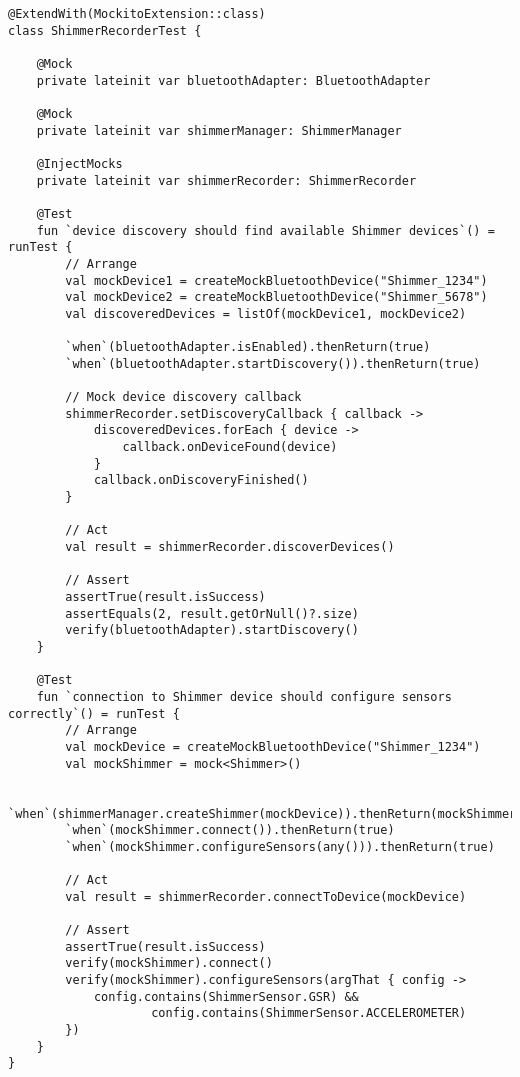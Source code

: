 \documentclass[12pt,a4paper]{report}
\begin{document}
\begin{verbatim}
@ExtendWith(MockitoExtension::class)
class ShimmerRecorderTest {

    @Mock
    private lateinit var bluetoothAdapter: BluetoothAdapter

    @Mock
    private lateinit var shimmerManager: ShimmerManager

    @InjectMocks
    private lateinit var shimmerRecorder: ShimmerRecorder

    @Test
    fun `device discovery should find available Shimmer devices`() = runTest {
        // Arrange
        val mockDevice1 = createMockBluetoothDevice("Shimmer_1234")
        val mockDevice2 = createMockBluetoothDevice("Shimmer_5678")
        val discoveredDevices = listOf(mockDevice1, mockDevice2)

        `when`(bluetoothAdapter.isEnabled).thenReturn(true)
        `when`(bluetoothAdapter.startDiscovery()).thenReturn(true)

        // Mock device discovery callback
        shimmerRecorder.setDiscoveryCallback { callback ->
            discoveredDevices.forEach { device ->
                callback.onDeviceFound(device)
            }
            callback.onDiscoveryFinished()
        }

        // Act
        val result = shimmerRecorder.discoverDevices()

        // Assert
        assertTrue(result.isSuccess)
        assertEquals(2, result.getOrNull()?.size)
        verify(bluetoothAdapter).startDiscovery()
    }

    @Test
    fun `connection to Shimmer device should configure sensors correctly`() = runTest {
        // Arrange
        val mockDevice = createMockBluetoothDevice("Shimmer_1234")
        val mockShimmer = mock<Shimmer>()

        `when`(shimmerManager.createShimmer(mockDevice)).thenReturn(mockShimmer)
        `when`(mockShimmer.connect()).thenReturn(true)
        `when`(mockShimmer.configureSensors(any())).thenReturn(true)

        // Act
        val result = shimmerRecorder.connectToDevice(mockDevice)

        // Assert
        assertTrue(result.isSuccess)
        verify(mockShimmer).connect()
        verify(mockShimmer).configureSensors(argThat { config ->
            config.contains(ShimmerSensor.GSR) &&
                    config.contains(ShimmerSensor.ACCELEROMETER)
        })
    }
}
\end{verbatim}
\end{document}
